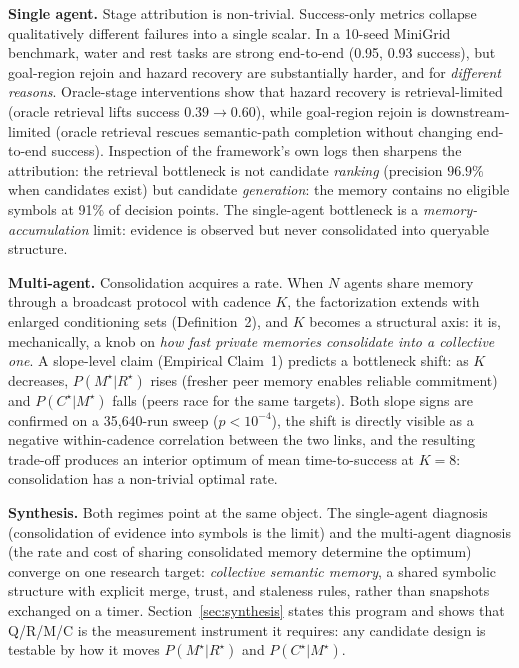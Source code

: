 \documentclass{article}
\begin{document}
\textbf{Single agent.} Stage attribution is non-trivial.
Success-only metrics collapse qualitatively different failures into a
single scalar. In a 10-seed MiniGrid benchmark, water and rest tasks
are strong end-to-end (0.95, 0.93 success), but goal-region rejoin and
hazard recovery are substantially harder, and for \emph{different
reasons}. Oracle-stage interventions show that hazard recovery is
retrieval-limited (oracle retrieval lifts success $0.39 \to 0.60$),
while goal-region rejoin is downstream-limited (oracle retrieval
rescues semantic-path completion without changing end-to-end success).
Inspection of the framework's own logs then sharpens the attribution:
the retrieval bottleneck is not candidate \emph{ranking} (precision
$96.9\%$ when candidates exist) but candidate \emph{generation}: the
memory contains no eligible symbols at 91\% of decision points.
The single-agent bottleneck is a \emph{memory-accumulation} limit:
evidence is observed but never consolidated into queryable structure.

\textbf{Multi-agent.} Consolidation acquires a rate.
When $N$ agents share memory through a broadcast protocol with cadence
$K$, the factorization extends with enlarged conditioning sets
(Definition~2), and $K$ becomes a structural axis: it
is, mechanically, a knob on \emph{how fast private memories consolidate
into a collective one}. A slope-level claim
(Empirical Claim~1) predicts a bottleneck shift: as $K$
decreases, $P(M^\star|R^\star)$ rises (fresher peer memory enables
reliable commitment) and $P(C^\star|M^\star)$ falls (peers race for
the same targets). Both slope signs are confirmed on a 35{,}640-run
sweep ($p < 10^{-4}$), the shift is directly visible as a negative
within-cadence correlation between the two links, and the resulting
trade-off produces an interior optimum of mean time-to-success at
$K\!=\!8$: consolidation has a non-trivial optimal rate.

\textbf{Synthesis.} Both regimes point at the same object.
The single-agent diagnosis (consolidation of evidence into symbols is
the limit) and the multi-agent diagnosis (the rate and cost of sharing
consolidated memory determine the optimum) converge on one research
target: \emph{collective semantic memory}, a shared symbolic
structure with explicit merge, trust, and staleness rules, rather than
snapshots exchanged on a timer. Section~\ref{sec:synthesis} states
this program and shows that Q/R/M/C is the measurement instrument it
requires: any candidate design is testable by how it moves
$P(M^\star|R^\star)$ and $P(C^\star|M^\star)$.
\end{document}
